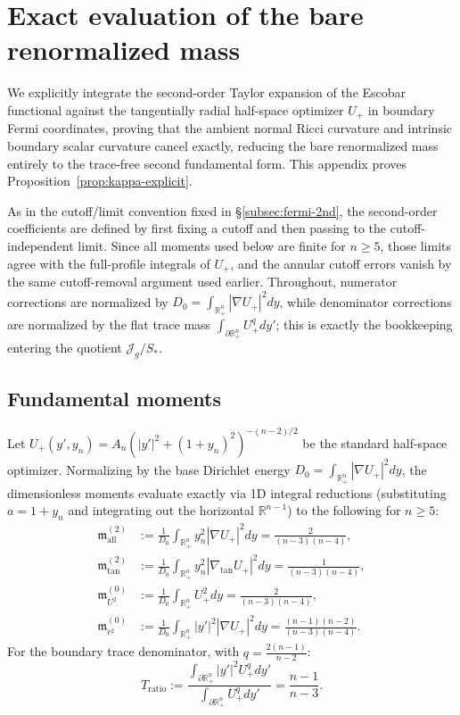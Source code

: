 \documentclass[11pt,reqno,a4paper]{amsart}
\newcommand{\R}{\mathbb{R}}
\numberwithin{equation}{section}
\theoremstyle{plain}
\theoremstyle{remark}
\theoremstyle{plain}
\begin{document}
\section{Exact evaluation of the bare renormalized mass}
\label{app:exact-mass}

We explicitly integrate the second-order Taylor expansion of the Escobar functional
against the tangentially radial half-space optimizer $U_+$ in boundary Fermi coordinates,
proving that the ambient normal Ricci curvature and intrinsic boundary scalar curvature
cancel exactly, reducing the bare renormalized mass entirely to the trace-free second
fundamental form. This appendix proves Proposition~\ref{prop:kappa-explicit}.

As in the cutoff/limit convention fixed in \S\ref{subsec:fermi-2nd}, the second-order
coefficients are defined by first fixing a cutoff and then passing to the cutoff-independent
limit. Since all moments used below are finite for $n\ge5$, those limits agree with the
full-profile integrals of $U_+$, and the annular cutoff errors vanish by the same cutoff-removal
argument used earlier. Throughout, numerator corrections are normalized by
$D_0=\int_{\R^n_+}|\nabla U_+|^2dy$, while denominator corrections are normalized by the flat
trace mass $\int_{\partial\R^n_+}U_+^qdy'$; this is exactly the bookkeeping entering the quotient
$\mathcal J_g/S_*$.

\subsection*{Fundamental moments}
Let $U_+(y', y_n) = A_n (|y'|^2 + (1+y_n)^2)^{-(n-2)/2}$ be the standard half-space optimizer.
Normalizing by the base Dirichlet energy $D_0 = \int_{\mathbb R^n_+} |\nabla U_+|^2dy$,
the dimensionless moments evaluate exactly via 1D integral reductions
(substituting $a = 1+y_n$ and integrating out the horizontal $\mathbb R^{n-1}$)
to the following for $n \ge 5$:
\begin{align}
\mathfrak{m}_{\mathrm{all}}^{(2)} &:= \frac{1}{D_0} \int_{\mathbb R^n_+} y_n^2 |\nabla U_+|^2dy
= \frac{2}{(n-3)(n-4)}, \label{eq:moment-all}\\
\mathfrak{m}_{\mathrm{tan}}^{(2)} &:= \frac{1}{D_0} \int_{\mathbb R^n_+} y_n^2 |\nabla_{\mathrm{tan}} U_+|^2dy
= \frac{1}{(n-3)(n-4)}, \label{eq:moment-tan}\\
\mathfrak{m}_{U^2}^{(0)} &:= \frac{1}{D_0} \int_{\mathbb R^n_+} U_+^2dy
= \frac{2}{(n-3)(n-4)}, \label{eq:moment-U2}\\
\mathfrak{m}_{r^2}^{(0)} &:= \frac{1}{D_0} \int_{\mathbb R^n_+} |y'|^2 |\nabla U_+|^2dy
= \frac{(n-1)(n-2)}{(n-3)(n-4)}. \label{eq:moment-r2}
\end{align}
For the boundary trace denominator, with $q=\frac{2(n-1)}{n-2}$:
\begin{equation}\label{eq:moment-Tratio}
T_{\mathrm{ratio}} := \frac{\int_{\partial\mathbb R^n_+} |y'|^2 U_+^qdy'}
{\int_{\partial\mathbb R^n_+} U_+^qdy'} = \frac{n-1}{n-3}.
\end{equation}
\end{document}
